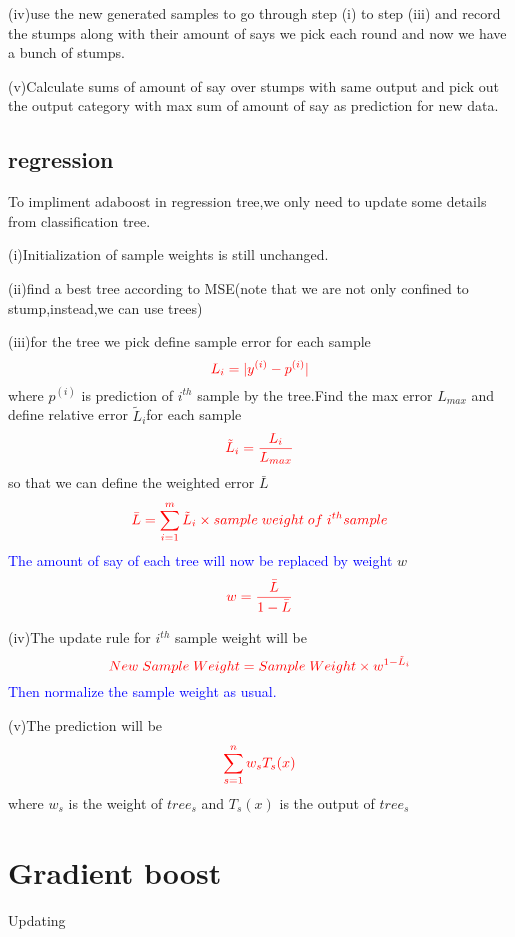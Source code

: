 \documentclass{article}
\begin{document}
(iv)use the new generated samples to go through step (i) to step (iii) and record the stumps along with their amount of says we pick each round and now we have a bunch of stumps.

(v)Calculate sums of amount of say over stumps with same output and pick out the output category with max sum of amount of say as prediction for new data.
\subsection{regression}
To impliment adaboost in regression tree,we only need to update some details from classification tree.

(i)Initialization of sample weights is still unchanged.

(ii)find a best tree according to MSE(note that we are not only confined to stump,instead,we can use trees)

(iii)for the tree we pick define sample error for each sample$$\textcolor{red}{L_i=|y^{(i)}-p^{(i)}|}$$where $p^{(i)}$ is prediction of  $i^{th}$ sample by the tree.Find the max error $L_{max}$ and define relative error $\tilde{L}_i$for each sample$$\textcolor{red}{\tilde{L}_i=\frac{L_i}{L_{max}}}$$so that we can define the weighted error $\bar{L}$ $$\textcolor{red}{\bar{L}=\sum_{i=1}^{m}\tilde{L}_i\times sample\;weight\;of\;i^{th}sample}$$ \textcolor{blue}{The amount of say of each tree will now be replaced by weight} $w$ $$\textcolor{red}{w=\frac{\bar{L}}{1-\bar{L}}}$$

(iv)The update rule for $i^{th}$ sample weight will be $$\textcolor{red}{New\;Sample\;Weight=Sample\;Weight\times w^{1-\tilde{L}_i}}$$
\textcolor{blue}{Then normalize the sample weight as usual.}

(v)The prediction will be$$\textcolor{red}{\sum_{s=1}^{n}w_s T_s(x)}$$where $w_s$ is the weight of $tree_s$ and $T_s(x)$ is the output of $tree_s$
\section{Gradient boost}
Updating
\end{document}
